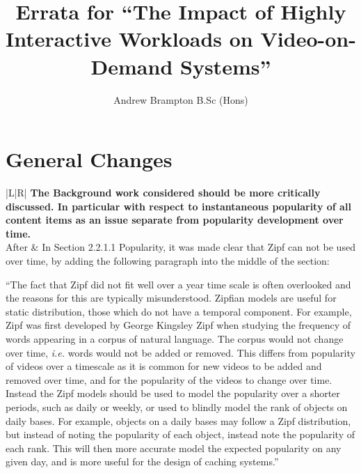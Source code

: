 \documentclass[a4paper,oneside,11pt]{article} %
\title{Errata for ``The Impact of Highly Interactive Workloads on Video-on-Demand Systems''}
\author{Andrew Brampton B.Sc (Hons)}
\date{}
\begin{document}

\newenvironment{errata}
    { \noindent\begin{tabular}{|L|R|}\hline }
    { \end{tabular} \\~\\}

\newcommand{\heading}[1]{\multicolumn{2}{|H|} {\textbf{ #1 }}\\\hline}
\newcommand{\note}  [1]{Note   & #1 \\\hline}
\newcommand{\before}[1]{Before & #1 \\\hline}
\newcommand{\after} [1]{After  & #1 \\\hline}

\maketitle

\section{General Changes}

\begin{errata}
    \heading{The Background work considered should be more critically discussed. In particular with respect to instantaneous popularity of all content items as an issue separate from popularity development over time.}
    \after{
    In Section 2.2.1.1 Popularity, it was made clear that Zipf can not be used over time, by adding the following paragraph into the middle of the section:

        ``The fact that Zipf did not fit well over a year time scale is often overlooked and the reasons for this are typically misunderstood. Zipfian models are useful for static distribution, those which do not have a temporal component. For example, Zipf was first developed by George Kingsley Zipf when studying the frequency of words appearing in a corpus of natural language. The corpus would not change over time, \emph{i.e.} words would not be added or removed. This differs from popularity of videos over a timescale as it is common for new videos to be added and removed over time, and for the popularity of the videos to change over time. Instead the Zipf models should be used to model the popularity over a shorter periods, such as daily or weekly, or used to blindly model the rank of objects on daily bases. For example, objects on a daily bases may follow a Zipf distribution, but instead of noting the popularity of each object, instead note the popularity of each rank. This will then more accurate model the expected popularity on any given day, and is more useful for the design of caching systems.''
    }
\end{errata}
\end{document}
